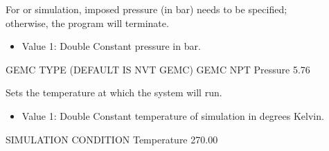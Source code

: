 \documentclass[letterpaper,10pt,english]{sphinxmanual}
\begin{document}
\begin{description}
\item[{}] \leavevmode
\sphinxAtStartPar
For  or  simulation, imposed pressure (in bar) needs to be specified; otherwise, the program will terminate.
\begin{itemize}
\item {} 
\sphinxAtStartPar
Value 1: Double \sphinxhyphen{} Constant pressure in bar.

\end{itemize}

\begin{sphinxVerbatim}[commandchars=\\\{\}]
\PYGZsh{}\PYGZsh{}\PYGZsh{}\PYGZsh{}\PYGZsh{}\PYGZsh{}\PYGZsh{}\PYGZsh{}\PYGZsh{}\PYGZsh{}\PYGZsh{}\PYGZsh{}\PYGZsh{}\PYGZsh{}\PYGZsh{}\PYGZsh{}\PYGZsh{}\PYGZsh{}\PYGZsh{}\PYGZsh{}\PYGZsh{}\PYGZsh{}\PYGZsh{}\PYGZsh{}\PYGZsh{}\PYGZsh{}\PYGZsh{}\PYGZsh{}\PYGZsh{}\PYGZsh{}\PYGZsh{}\PYGZsh{}\PYGZsh{}
\PYGZsh{} GEMC TYPE (DEFAULT IS NVT GEMC)
\PYGZsh{}\PYGZsh{}\PYGZsh{}\PYGZsh{}\PYGZsh{}\PYGZsh{}\PYGZsh{}\PYGZsh{}\PYGZsh{}\PYGZsh{}\PYGZsh{}\PYGZsh{}\PYGZsh{}\PYGZsh{}\PYGZsh{}\PYGZsh{}\PYGZsh{}\PYGZsh{}\PYGZsh{}\PYGZsh{}\PYGZsh{}\PYGZsh{}\PYGZsh{}\PYGZsh{}\PYGZsh{}\PYGZsh{}\PYGZsh{}\PYGZsh{}\PYGZsh{}\PYGZsh{}\PYGZsh{}\PYGZsh{}\PYGZsh{}
GEMC        NPT
Pressure    5.76
\end{sphinxVerbatim}

\item[{}] \leavevmode
\sphinxAtStartPar
Sets the temperature at which the system will run.
\begin{itemize}
\item {} 
\sphinxAtStartPar
Value 1: Double \sphinxhyphen{} Constant temperature of simulation in degrees Kelvin.

\end{itemize}

\begin{sphinxVerbatim}[commandchars=\\\{\}]
\PYGZsh{}\PYGZsh{}\PYGZsh{}\PYGZsh{}\PYGZsh{}\PYGZsh{}\PYGZsh{}\PYGZsh{}\PYGZsh{}\PYGZsh{}\PYGZsh{}\PYGZsh{}\PYGZsh{}\PYGZsh{}\PYGZsh{}\PYGZsh{}\PYGZsh{}\PYGZsh{}\PYGZsh{}\PYGZsh{}\PYGZsh{}\PYGZsh{}\PYGZsh{}\PYGZsh{}\PYGZsh{}\PYGZsh{}\PYGZsh{}\PYGZsh{}\PYGZsh{}\PYGZsh{}\PYGZsh{}\PYGZsh{}\PYGZsh{}
\PYGZsh{} SIMULATION CONDITION
\PYGZsh{}\PYGZsh{}\PYGZsh{}\PYGZsh{}\PYGZsh{}\PYGZsh{}\PYGZsh{}\PYGZsh{}\PYGZsh{}\PYGZsh{}\PYGZsh{}\PYGZsh{}\PYGZsh{}\PYGZsh{}\PYGZsh{}\PYGZsh{}\PYGZsh{}\PYGZsh{}\PYGZsh{}\PYGZsh{}\PYGZsh{}\PYGZsh{}\PYGZsh{}\PYGZsh{}\PYGZsh{}\PYGZsh{}\PYGZsh{}\PYGZsh{}\PYGZsh{}\PYGZsh{}\PYGZsh{}\PYGZsh{}\PYGZsh{}
Temperature   270.00
\end{sphinxVerbatim}


\end{description}
\end{document}
